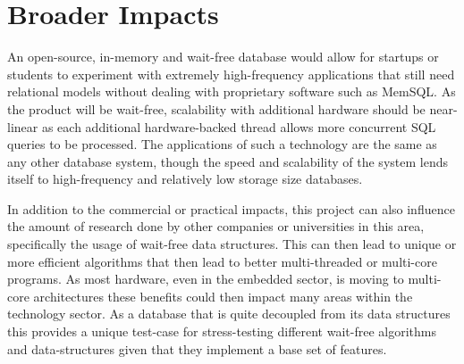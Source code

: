 \documentclass[letterpaper, 11pt]{article}
\begin{document}
\section{Broader Impacts}
An open-source, in-memory and wait-free database would allow for startups or students to
experiment with extremely high-frequency applications that still need relational
models without dealing with proprietary software such as MemSQL. As the product
will be wait-free, scalability with additional hardware should be near-linear as each
additional hardware-backed thread allows more concurrent SQL queries to be processed.
The applications of such a technology are the same as any other database system,
though the speed and scalability of the system lends itself to high-frequency and
relatively low storage size databases.
\par\vspace{\baselineskip}
In addition to the commercial or practical impacts, this project can also influence the
amount of research done by other companies or universities in this area, specifically the
usage of wait-free data structures. This can then lead to unique or more efficient
algorithms that then lead to better multi-threaded or multi-core programs. As most hardware,
even in the embedded sector, is moving to multi-core architectures these benefits could
then impact many areas within the technology sector. As a database that is quite decoupled
from its data structures this provides a unique test-case for stress-testing different wait-free
algorithms and data-structures given that they implement a base set of features.
\newpage
\end{document}
